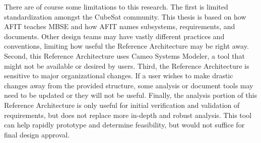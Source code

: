 
    
There are of course some limitations to this research. The first is limited standardization amongst the CubeSat community. This thesis is based on how AFIT teaches MBSE and how AFIT names subsystems, requirements, and documents. Other design teams may have vastly different practices and conventions, limiting how useful the Reference Architecture may be right away. Second, this Reference Architecture uses Cameo Systems Modeler, a tool that might not be available or desired by users. Third, the Reference Architecture is sensitive to major organizational changes. If a user wishes to make drastic changes away from the provided structure, some analysis or document tools may need to be updated or they will not be useful. Finally, the analysis portion of this Reference Architecture is only useful for initial verification and validation of requirements, but does not replace more in-depth and robust analysis. This tool can help rapidly prototype and determine feasibility, but would not suffice for final design approval. 